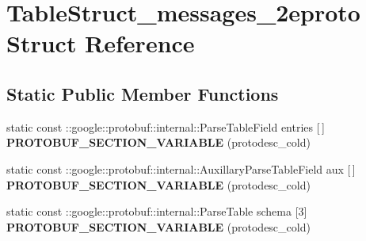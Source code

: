 \hypertarget{structTableStruct__messages__2eproto}{}\section{Table\+Struct\+\_\+messages\+\_\+2eproto Struct Reference}
\label{structTableStruct__messages__2eproto}
\subsection*{Static Public Member Functions}
\begin{DoxyCompactItemize}
\item 
\mbox{\label{structTableStruct__messages__2eproto_a5dec8c7a9142d8d762ddce6edd468e97}} 
static const \+::google\+::protobuf\+::internal\+::\+Parse\+Table\+Field entries \mbox{[}$\,$\mbox{]} {\bfseries P\+R\+O\+T\+O\+B\+U\+F\+\_\+\+S\+E\+C\+T\+I\+O\+N\+\_\+\+V\+A\+R\+I\+A\+B\+LE} (protodesc\+\_\+cold)
\item 
\mbox{\label{structTableStruct__messages__2eproto_a62b2e242d56dc84c91963f67528e4683}} 
static const \+::google\+::protobuf\+::internal\+::\+Auxillary\+Parse\+Table\+Field aux \mbox{[}$\,$\mbox{]} {\bfseries P\+R\+O\+T\+O\+B\+U\+F\+\_\+\+S\+E\+C\+T\+I\+O\+N\+\_\+\+V\+A\+R\+I\+A\+B\+LE} (protodesc\+\_\+cold)
\item 
\mbox{\label{structTableStruct__messages__2eproto_aadd326b9fde88a7378adb79ea15626cb}} 
static const \+::google\+::protobuf\+::internal\+::\+Parse\+Table schema \mbox{[}3\mbox{]} {\bfseries P\+R\+O\+T\+O\+B\+U\+F\+\_\+\+S\+E\+C\+T\+I\+O\+N\+\_\+\+V\+A\+R\+I\+A\+B\+LE} (protodesc\+\_\+cold)
\end{DoxyCompactItemize}
